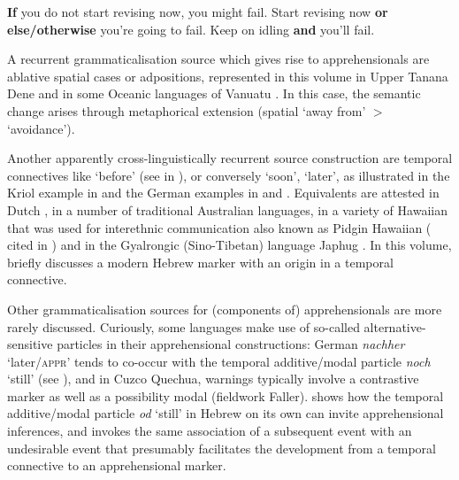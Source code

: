 \documentclass[output=paper,colorlinks,citecolor=brown
]{langscibook}
\begin{document}
\ea\label{ex:intro24}
\ea\label{ex:intro24a} \textbf{If} you do not start revising now, you might fail.
\ex\label{ex:intro24b} Start revising now \textbf{or else/otherwise} you're going to fail.
\ex\label{ex:intro24c} Keep on idling \textbf{and} you'll fail.
\z
\z

 A recurrent grammaticalisation source which gives rise to apprehensionals are ablative spatial cases or adpositions, represented in this volume in Upper Tanana Dene \citep{chapters/lovick} and in some Oceanic languages of Vanuatu \citep{chapters/francois}. In this case, the semantic change arises through metaphorical extension (spatial `away from' $>$ `avoidance').

Another apparently cross-linguistically recurrent source construction are temporal connectives like `before' (see  in ), or conversely `soon', `later', as illustrated in the Kriol example in  and the German examples in  and . Equivalents are attested in Dutch \citep{boogaart2009,boogaart2020}, in a number of traditional Australian languages, in a variety of Hawaiian that was used for interethnic communication also known as Pidgin Hawaiian (\citealt{roberts2013} cited in \citealt[283]{angeloschultzeberndt2016}) and in the Gyalrongic (Sino-Tibetan) language Japhug \citep[1419--1420]{jacques2021}. In this volume, \citet{chapters/francez} briefly discusses a modern Hebrew marker with an origin in a temporal connective.

Other grammaticalisation sources for (components of) apprehensionals are more rarely discussed. Curiously, some languages make use of so-called alternative{\hyp}sensitive particles in their apprehensional constructions: German \textit{nachher} `later/\textsc{appr}' tends to co-occur with the temporal additive/modal particle \textit{noch} `still' (see ), and in Cuzco Quechua, warnings typically involve a contrastive marker as well as a possibility modal (fieldwork Faller). \citet{chapters/francez} shows how the temporal additive/modal particle \textit{od} `still' in Hebrew on its own can invite apprehensional inferences, and invokes the same association of a subsequent event with an undesirable event that presumably facilitates the development from a temporal connective to an apprehensional marker.
\end{document}
